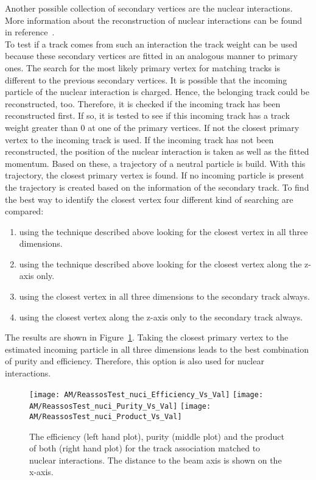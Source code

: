 Another possible collection of secondary vertices are the nuclear interactions. More information about the reconstruction of nuclear interactions can be found in reference~. \\
To test if a track comes from such an interaction the track weight can be used because these secondary vertices are fitted in an analogous manner to primary ones.  The search for the most likely primary vertex for matching tracks is different to the previous secondary vertices. It is possible that the incoming particle of the nuclear interaction is charged. Hence, the belonging track could be reconstructed, too. Therefore, it is checked if the incoming track has been reconstructed first. If so, it is tested to see if this incoming track has a track weight greater than 0 at one of the primary vertices. If not the closest primary vertex to the incoming track is used. If the incoming track has not been reconstructed, the position of the nuclear interaction is taken as well as the fitted momentum. Based on these, a trajectory of a neutral particle is build. With this trajectory, the closest primary vertex is found. If no incoming particle is present the trajectory is created based on the information of the secondary track. To find the best way to identify the closest vertex four different kind of searching are compared: 
\begin{enumerate}
\item using the technique described above looking for the closest vertex in all three dimensions.
\item using the technique described above looking for the closest vertex along the z-axis only.
\item using the closest vertex in all three dimensions to the secondary track always. 
\item using the closest vertex along the z-axis only to the secondary track always. 
\end{enumerate}
The results are shown in Figure~\ref{plot:AMWFSVnuciEffAndPurSO}. Taking the closest primary vertex to the estimated incoming particle in all three dimensions leads to the best combination of purity and efficiency. Therefore, this option is also used for nuclear interactions.

\begin{figure}[!ht]
  \centering
  \texttt{[image: AM/ReassosTest\_nuci\_Efficiency\_Vs\_Val]}
  \texttt{[image: AM/ReassosTest\_nuci\_Purity\_Vs\_Val]}
  \texttt{[image: AM/ReassosTest\_nuci\_Product\_Vs\_Val]}
  \caption[Efficiency, purity and their product of the association with nuclear interactions for different search options as a function of distance to the beam axis]{The efficiency (left hand plot), purity (middle plot) and the product of both (right hand plot) for the track association matched to nuclear interactions. The distance to the beam axis is shown on the x-axis.\label{plot:AMWFSVnuciEffAndPurSO}}
\end{figure}

